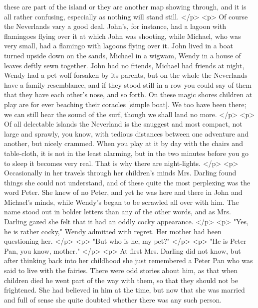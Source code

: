       these are part of the island or they are another map showing through, and
      it is all rather confusing, especially as nothing will stand still.
    </p>
    <p>
      Of course the Neverlands vary a good deal. John's, for instance, had a
      lagoon with flamingoes flying over it at which John was shooting, while
      Michael, who was very small, had a flamingo with lagoons flying over it.
      John lived in a boat turned upside down on the sands, Michael in a wigwam,
      Wendy in a house of leaves deftly sewn together. John had no friends,
      Michael had friends at night, Wendy had a pet wolf forsaken by its
      parents, but on the whole the Neverlands have a family resemblance, and if
      they stood still in a row you could say of them that they have each
      other's nose, and so forth. On these magic shores children at play are for
      ever beaching their coracles [simple boat]. We too have been there; we can
      still hear the sound of the surf, though we shall land no more.
    </p>
    <p>
      Of all delectable islands the Neverland is the snuggest and most compact,
      not large and sprawly, you know, with tedious distances between one
      adventure and another, but nicely crammed. When you play at it by day with
      the chairs and table-cloth, it is not in the least alarming, but in the
      two minutes before you go to sleep it becomes very real. That is why there
      are night-lights.
    </p>
    <p>
      Occasionally in her travels through her children's minds Mrs. Darling
      found things she could not understand, and of these quite the most
      perplexing was the word Peter. She knew of no Peter, and yet he was here
      and there in John and Michael's minds, while Wendy's began to be scrawled
      all over with him. The name stood out in bolder letters than any of the
      other words, and as Mrs. Darling gazed she felt that it had an oddly cocky
      appearance.
    </p>
    <p>
      "Yes, he is rather cocky," Wendy admitted with regret. Her mother had been
      questioning her.
    </p>
    <p>
      "But who is he, my pet?"
    </p>
    <p>
      "He is Peter Pan, you know, mother."
    </p>
    <p>
      At first Mrs. Darling did not know, but after thinking back into her
      childhood she just remembered a Peter Pan who was said to live with the
      fairies. There were odd stories about him, as that when children died he
      went part of the way with them, so that they should not be frightened. She
      had believed in him at the time, but now that she was married and full of
      sense she quite doubted whether there was any such person.
